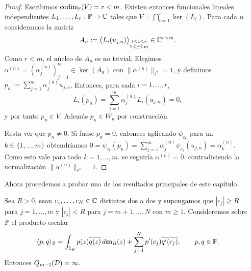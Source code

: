 \begin{proof}
	Escribimos $\operatorname{codim}_{\mathbb{P}}(V)=r<m$. Existen entonces funcionales lineales independientes $L_1,\dots,L_r:\mathbb{P}\to\mathbb{C}$ tales que $V=\bigcap_{i=1}^r\ker(L_i)$.
	Para cada $n$ consideramos la matriz
	\[
		A_n:=\bigl(L_i(u_{j,n})\bigr)_{\substack{1\le i\le r\\ 1\le j\le m}}\in\mathbb{C}^{r\times m}.
	\]
	Como $r<m$, el núcleo de $A_n$ es no trivial. Elegimos $\alpha^{(n)}=(\alpha_j^{(n)})_{j=1}^m\in\ker(A_n)$ con $\|\alpha^{(n)}\|_{\ell^2}=1$, y definimos $p_n:=\sum_{j=1}^m \alpha_j^{(n)}u_{j,n}$.
	Entonces, para cada $i=1,\dots,r$,
	\[
		L_i(p_n)=\sum_{j=1}^m \alpha_j^{(n)}L_i(u_{j,n})=0,
	\]
	y por tanto $p_n\in V$. Además $p_n\in W_n$ por construcción.

	Resta ver que $p_n\neq0$. Si fuese $p_n=0$, entonces aplicando $\psi_{c_k}$ para un $k\in\{1,\dots,m\}$ obtendríamos $0=\psi_{c_k}(p_n)=\sum_{j=1}^m \alpha_j^{(n)}\psi_{c_k}(u_{j,n})=\alpha_k^{(n)}$.
	Como esto vale para todo $k=1,\dots,m$, se seguiría $\alpha^{(n)}=0$, contradiciendo la normalización $\|\alpha^{(n)}\|_{\ell^2}=1$.
\end{proof}

Ahora procedemos a probar uno de los resultados principales de este capítulo.

\begin{thm}\label{thm:umbral_fase2}\label{prop:umbral_fase2}
	Sea $R>0$, sean $c_1,\dots,c_N\in\mathbb{C}$ distintos dos a dos y supongamos que $|c_j|\ge R$ para $j=1,\dots,m$ y $|c_j|<R$ para $j=m+1,\dots,N$ con $m\ge1$. Consideremos sobre $\mathbb{P}$ el producto escalar
	\[
		\langle p,q\rangle_S
		=
		\int_{\mathbb{S}_R} p(z)\overline{q(z)}\,d\mathbf{m}_R(z)
		+
		\sum_{j=1}^N p'(c_j)\overline{q'(c_j)},
		\qquad p,q\in\mathbb{P}.
	\]
	Entonces
	\(
	Q_{m-1}(\mathcal{D})=\infty.
	\)
\end{thm}

